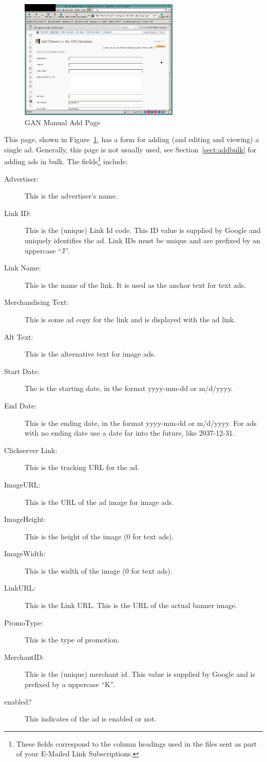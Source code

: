 \documentclass[letterpaper]{article}
\begin{document}
\begin{figure}[ht]
\begin{centering}
\includegraphics[width=3in]{ganmanualadd.png}
\caption{GAN Manual Add Page}
\label{fig:manualadd}
\end{centering}
\end{figure}
This page, shown in Figure~\ref{fig:manualadd}, has a form for adding
(and editing and viewing) a single ad. Generally, this page is not
usually used, see Section~\ref{sect:addbulk} for adding ads in bulk.
The fields\footnote{These fields correspond to the column headings used
in the files sent as part of your E-Mailed Link Subscriptions.}
include: 

\begin{description}
  \item[Advertiser:] This is the advertiser's name.
  \item[Link ID:] This is the (unique) Link Id code. This ID value is
supplied by Google and uniquely identifies the ad.  Link IDs must be
unique and are prefixed by an uppercase ``J''.
  \item[Link Name:] This is the name of the link.  It is used as the
anchor text for text ads.
  \item[Merchandising Text:] This is some ad copy for the
link and is displayed with the ad link.
  \item[Alt Text:] This is the alternative text for image
ads.
  \item[Start Date:] The is the starting date, in the format yyyy-mm-dd
or m/d/yyyy. 
  \item[End Date:] This is the ending date, in the format yyyy-mm-dd or
m/d/yyyy. For ads with no ending date use a date far into the future,
like 2037-12-31.
  \item[Clickserver Link:] This is the tracking URL for the ad. 
  \item[ImageURL:] This is the URL of the ad image for image ads. 
  \item[ImageHeight:] This is the height of the image (0 for text ads). 
  \item[ImageWidth:] This is the width of the image (0 for text ads). 
  \item[LinkURL:] This is the Link URL.  This is the URL of the actual
banner image.
  \item[PromoType:] This is the type of promotion.
  \item[MerchantID:] This is the (unique) merchant id.  This value is
supplied by Google and is prefixed by a uppercase ``K''.
  \item[enabled?] This indicates of the ad is enabled or
not. 
\end{description}
\end{document}
